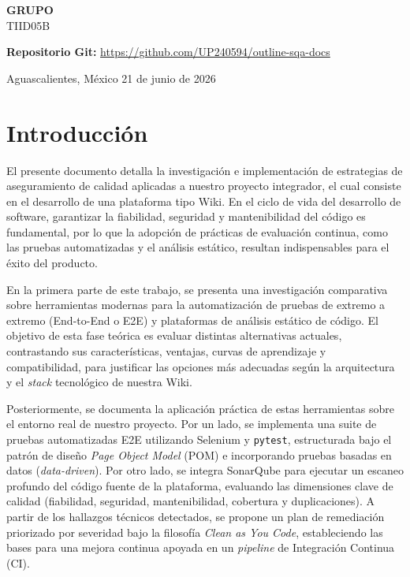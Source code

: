 \documentclass[12pt]{article}
\begin{document}
\begin{titlepage}
\begin{center}
        \vspace{0.1cm}

        {\large \textbf{GRUPO}}\\
        TIID05B

        \vfill
        {\large \textbf{Repositorio Git:} \url{https://github.com/UP240594/outline-sqa-docs}}

        {\large Aguascalientes, México  21 de junio de 2026}\\
       
    \end{center}
\end{titlepage}

\newpage
\tableofcontents
\newpage

\section{Introducción}


El presente documento detalla la investigación e implementación de estrategias de aseguramiento de calidad aplicadas a nuestro proyecto integrador, el cual consiste en el desarrollo de una plataforma tipo Wiki. En el ciclo de vida del desarrollo de software, garantizar la fiabilidad, seguridad y mantenibilidad del código es fundamental, por lo que la adopción de prácticas de evaluación continua, como las pruebas automatizadas y el análisis estático, resultan indispensables para el éxito del producto.

En la primera parte de este trabajo, se presenta una investigación comparativa sobre herramientas modernas para la automatización de pruebas de extremo a extremo (End-to-End o E2E) y plataformas de análisis estático de código. El objetivo de esta fase teórica es evaluar distintas alternativas actuales, contrastando sus características, ventajas, curvas de aprendizaje y compatibilidad, para justificar las opciones más adecuadas según la arquitectura y el \textit{stack} tecnológico de nuestra Wiki.

Posteriormente, se documenta la aplicación práctica de estas herramientas sobre el entorno real de nuestro proyecto. Por un lado, se implementa una suite de pruebas automatizadas E2E utilizando Selenium y \texttt{pytest}, estructurada bajo el patrón de diseño \textit{Page Object Model} (POM) e incorporando pruebas basadas en datos (\textit{data-driven}). Por otro lado, se integra SonarQube para ejecutar un escaneo profundo del código fuente de la plataforma, evaluando las dimensiones clave de calidad (fiabilidad, seguridad, mantenibilidad, cobertura y duplicaciones). A partir de los hallazgos técnicos detectados, se propone un plan de remediación priorizado por severidad bajo la filosofía \textit{Clean as You Code}, estableciendo las bases para una mejora continua apoyada en un \textit{pipeline} de Integración Continua (CI).
\newpage
\end{document}
